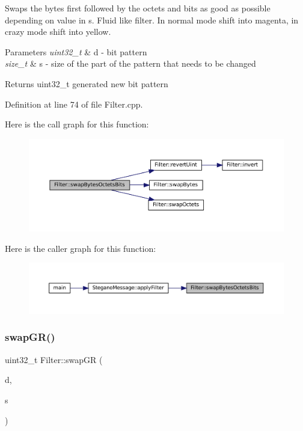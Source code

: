 Swaps the bytes first followed by the octets and bits as good as possible depending on value in s. Fluid like filter. In normal mode shift into magenta, in crazy mode shift into yellow. 


\begin{DoxyParams}{Parameters}
{\em uint32\+\_\+t} & d -\/ bit pattern \\
\hline
{\em size\+\_\+t} & s -\/ size of the part of the pattern that needs to be changed \\
\hline
\end{DoxyParams}
\begin{DoxyReturn}{Returns}
uint32\+\_\+t generated new bit pattern 
\end{DoxyReturn}


Definition at line 74 of file Filter.\+cpp.

Here is the call graph for this function\+:\nopagebreak
\begin{figure}[H]
\begin{center}
\leavevmode
\includegraphics[width=350pt]{classFilter_a9c8e2eb790e7e9dff6493a12a1fefc4f_cgraph}
\end{center}
\end{figure}
Here is the caller graph for this function\+:\nopagebreak
\begin{figure}[H]
\begin{center}
\leavevmode
\includegraphics[width=350pt]{classFilter_a9c8e2eb790e7e9dff6493a12a1fefc4f_icgraph}
\end{center}
\end{figure}
\mbox{\label{classFilter_ad6f109289f21be75db0a1351c86d3143}} 
\subsubsection{\texorpdfstring{swapGR()}{swapGR()}}
{\footnotesize\ttfamily uint32\+\_\+t Filter\+::swap\+GR (\begin{DoxyParamCaption}\item[{uint32\+\_\+t}]{d,  }\item[{size\+\_\+t}]{s }\end{DoxyParamCaption})\hspace{0.3cm}{\ttfamily [static]}}



